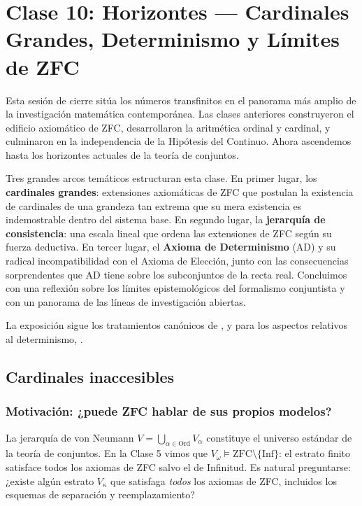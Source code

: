 \chapter{Clase 10: Horizontes --- Cardinales Grandes, Determinismo y Límites de ZFC}

Esta sesión de cierre sitúa los números transfinitos en el panorama más amplio de la investigación matemática contemporánea. Las clases anteriores construyeron el edificio axiomático de ZFC, desarrollaron la aritmética ordinal y cardinal, y culminaron en la independencia de la Hipótesis del Continuo. Ahora ascendemos hasta los horizontes actuales de la teoría de conjuntos.

Tres grandes arcos temáticos estructuran esta clase. En primer lugar, los \textbf{cardinales grandes}: extensiones axiomáticas de ZFC que postulan la existencia de cardinales de una grandeza tan extrema que su mera existencia es indemostrable dentro del sistema base. En segundo lugar, la \textbf{jerarquía de consistencia}: una escala lineal que ordena las extensiones de ZFC según su fuerza deductiva. En tercer lugar, el \textbf{Axioma de Determinismo} ($\mathrm{AD}$) y su radical incompatibilidad con el Axioma de Elección, junto con las consecuencias sorprendentes que $\mathrm{AD}$ tiene sobre los subconjuntos de la recta real. Concluimos con una reflexión sobre los límites epistemológicos del formalismo conjuntista y con un panorama de las líneas de investigación abiertas.

La exposición sigue los tratamientos canónicos de \cite{kanamori2003, jech2003, kunen2011}, y para los aspectos relativos al determinismo, \cite{moschovakis2009, woodin2010det}.

\section{Cardinales inaccesibles}

\subsection{Motivación: ¿puede ZFC hablar de sus propios modelos?}

La jerarquía de von Neumann $V = \bigcup_{\alpha \in \mathrm{Ord}} V_\alpha$ constituye el universo estándar de la teoría de conjuntos. En la Clase 5 vimos que $V_\omega \models \mathrm{ZFC} \setminus \{\mathrm{Inf}\}$: el estrato finito satisface todos los axiomas de ZFC salvo el de Infinitud. Es natural preguntarse: ¿existe algún estrato $V_\kappa$ que satisfaga \emph{todos} los axiomas de ZFC, incluidos los esquemas de separación y reemplazamiento?

